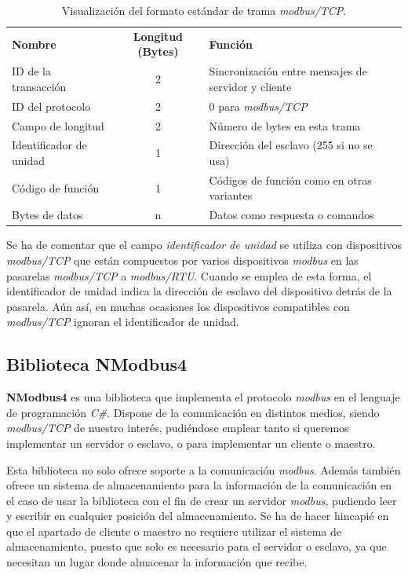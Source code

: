 \documentclass[pdftex,11pt,a4paper]{book}
\begin{document}
\begin{table}[htbp]
\begin{center}
\begin{tabular}{|lc p{8cm}|}
\hline
	\textbf{Nombre} & \textbf{Longitud (Bytes)} & \textbf{Función} \\
	ID de la transacción & 2 &	Sincronización entre mensajes de servidor y cliente \\
	ID del protocolo &	2 &	0 para \emph{modbus/TCP} \\
	Campo de longitud &	2 &	Número de bytes en esta trama \\
	Identificador de unidad &	1 &	Dirección del esclavo (255 si no se usa) \\
	Código de función &	1 &	Códigos de función como en otras variantes \\
	Bytes de datos &	n &	Datos como respuesta o comandos\\
\hline


\end{tabular}
\caption{\label{mobdus_trama}Visualización del formato estándar de trama \emph{modbus/TCP}.}

\end{center}
\end{table}

Se ha de comentar que el campo \emph{identificador de unidad} se utiliza con dispositivos \emph{modbus/TCP} que están compuestos por varios dispositivos \emph{modbus} en las pasarelas \emph{modbus/TCP} a \emph{modbus/RTU}. Cuando se emplea de esta forma, el identificador de unidad indica la dirección de esclavo del dispositivo detrás de la pasarela. Aún así, en muchas ocasiones los dispositivos compatibles con \emph{modbus/TCP} ignoran el identificador de unidad.

\subsection{Biblioteca NModbus4}

\textbf{NModbus4} \cite{nmodbusapi} es una biblioteca que implementa el protocolo \emph{modbus} en el lenguaje de programación \emph{C\#}. Dispone de la comunicación en distintos medios, siendo \emph{modbus/TCP} de nuestro interés, pudiéndose emplear tanto si queremos implementar un servidor o esclavo, o para implementar un cliente o maestro.

Esta biblioteca no solo ofrece soporte a la comunicación \emph{modbus}. Además también ofrece un sistema de almacenamiento para la información de la comunicación en el caso de usar la biblioteca con el fin de crear un servidor \emph{modbus}, pudiendo leer y escribir en cualquier posición del almacenamiento. 
Se ha de hacer hincapié en que el apartado de cliente o maestro no requiere utilizar el sistema de almacenamiento, puesto que solo es necesario para el servidor o esclavo, ya que necesitan un lugar donde almacenar la información que recibe. 
\end{document}

